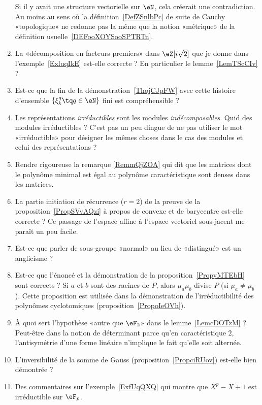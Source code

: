 \begin{enumerate}
        Si il y avait une structure vectorielle sur \( \eN\), cela créerait une contradiction. Au moins au sens où la définition~\ref{DefZSnlbPc} de suite de Cauchy «topologique» ne redonne pas la même que la notion «métrique» de la définition usuelle~\ref{DEFooXOYSooSPTRTn}.
    \item
        La «décomposition en facteurs premiers» dans \( \eZ[i\sqrt{2}]\) que je donne dans l'exemple~\ref{ExluqIkE} est-elle correcte ? En particulier le lemme~\ref{LemTScCIv} ?
    \item
        Est-ce que la fin de la démonstration~\ref{ThojCJpFW} avec cette histoire d'ensemble \( \{ \xi_k^q\tq q\in \eN \}\) fini est compréhensible ?
    \item
        Les représentations \emph{irréductibles} sont les modules \emph{indécomposables}. Quid des modules irréductibles ? C'est pas un peu dingue de ne pas utiliser le mot «irréductible» pour désigner les mêmes choses dans le cas des modules et celui des représentations ?
    \item
        Rendre rigoureuse la remarque \eqref{RemmQjZOA} qui dit que les matrices dont le polynôme minimal est égal au polynôme caractéristique sont denses dans les matrices.
    \item
        La partie initiation de récurrence (\( r=2\)) de la preuve de la proposition~\ref{PropSVvAQzi} à propos de convexe et de barycentre est-elle correcte ? Ce passage de l'espace affine à l'espace vectoriel sous-jacent me paraît un peu facile.
    \item
        Est-ce que parler de sous-groupe «normal» au lieu de «distingué» est un anglicisme ?
    \item
        Est-ce que l'énoncé et la démonstration de la proposition~\ref{PropyMTEbH} sont corrects ? Si \( a\) et \( b\) sont des racines de \( P\), alors \( \mu_a\mu_b\) divise \( P\) (si \( \mu_a\neq \mu_b\)). Cette proposition est utilisée dans la démonstration de l'irréductibilité des polynômes cyclotomiques (proposition~\ref{PropoIeOVh}).
    \item
        À quoi sert l'hypothèse «autre que \( \eF_2\)» dans le lemme~\ref{LemcDOTzM} ? Peut-être dans la notion de déterminant parce qu'en caractéristique \( 2\), l'antisymétrie d'une forme linéaire n'implique le fait qu'elle soit alternée.
    \item
        L'inversibilité de la somme de Gauss (proposition~\ref{PropciRUov}) est-elle bien démontrée ?
    \item
        Des commentaires sur l'exemple~\ref{ExfUqQXQ} qui montre que \( X^p-X+1\) est irréductible sur \( \eF_p\).

\end{enumerate}
